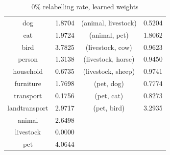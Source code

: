 \documentclass[11pt,a4paper]{article}
\begin{document}
\begin{table}[htbp]
\begin{tabular}{c|c|c|c}
dog           & 1.8704 & (animal, livestock)        & 0.5204\\
cat           & 1.9724 & (animal, pet)              & 1.8062\\
bird          & 3.7825 & (livestock, cow)           & 0.9623\\
person        & 1.3138 & (livestock, horse)         & 0.9450\\
household     & 0.6735 & (livestock, sheep)         & 0.9741\\
furniture     & 1.7698 & (pet, dog)                 & 0.7774\\
transport     & 0.1756 & (pet, cat)                 & 0.8273\\
landtransport & 2.9717 & (pet, bird)                & 3.2935\\
animal        & 2.6498 & &\\
livestock     & 0.0000 & &\\
pet           & 4.0644 & &
\end{tabular}
\caption{0\% relabelling rate, learned weights}
\label{tab:0weight}
\end{table}
\end{document}
